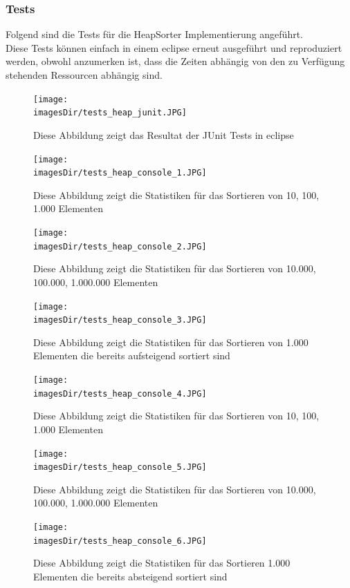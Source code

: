 \documentclass[11pt, a4paper, twoside]{article}   	%
\newcommand{\imagesDir}{images}
\newcommand{\testSection}{Tests}
\begin{document}
\subsubsection{\testSection}
Folgend sind die Tests für die HeapSorter Implementierung angeführt.\\
Diese Tests können einfach in einem eclipse erneut ausgeführt und reproduziert werden, obwohl anzumerken ist, dass die Zeiten abhängig von den zu Verfügung stehenden Ressourcen abhängig sind.
\begin{figure}[h]
  \centering
  \texttt{[image: \\imagesDir/tests\_heap\_junit.JPG]}
  \caption[JUnit Resultat]
   {Diese Abbildung zeigt das Resultat der JUnit Tests in eclipse}
\end{figure}
\newpage
\begin{figure}[h]
  \centering
  \texttt{[image: \\imagesDir/tests\_heap\_console\_1.JPG]}
  \caption[Konsolenausgabe der Statistiken]
   {Diese Abbildung zeigt die Statistiken für das Sortieren von 10, 100, 1.000 Elementen}
\end{figure}
\newpage
\begin{figure}[h]
  \centering
  \texttt{[image: \\imagesDir/tests\_heap\_console\_2.JPG]}
  \caption[Konsolenausgabe der Statistiken]
   {Diese Abbildung zeigt die Statistiken für das Sortieren von 10.000, 100.000, 1.000.000 Elementen}
\end{figure}
\newpage
\begin{figure}[h]
  \centering
  \texttt{[image: \\imagesDir/tests\_heap\_console\_3.JPG]}
  \caption[Konsolenausgabe der Statistiken]
   {Diese Abbildung zeigt die Statistiken für das Sortieren von 1.000 Elementen die bereits aufsteigend sortiert sind}
\end{figure}
\newpage
\begin{figure}[h]
  \centering
  \texttt{[image: \\imagesDir/tests\_heap\_console\_4.JPG]}
  \caption[Konsolenausgabe der Statistiken]
   {Diese Abbildung zeigt die Statistiken für das Sortieren von 10, 100, 1.000 Elementen}
\end{figure}
\newpage
\begin{figure}[h]
  \centering
  \texttt{[image: \\imagesDir/tests\_heap\_console\_5.JPG]}
  \caption[Konsolenausgabe der Statistiken]
   {Diese Abbildung zeigt die Statistiken für das Sortieren von 10.000, 100.000, 1.000.000 Elementen}
\end{figure}
\newpage
\begin{figure}[h]
  \centering
  \texttt{[image: \\imagesDir/tests\_heap\_console\_6.JPG]}
  \caption[Konsolenausgabe der Statistiken]
   {Diese Abbildung zeigt die Statistiken für das Sortieren 1.000 Elementen die bereits absteigend sortiert sind}
\end{figure}
\newpage
\end{document}
